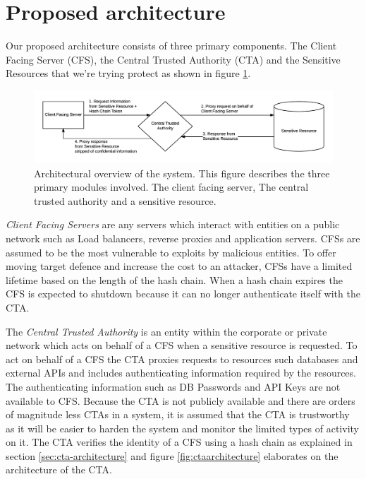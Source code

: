 \documentclass[a4paper,twoside]{article}
\begin{document}
\section{Proposed architecture}

Our proposed architecture consists of three primary components. The Client Facing Server (CFS), the Central Trusted Authority (CTA) and the Sensitive Resources that we're trying protect as shown in figure \ref{fig:architectureoverview}. 

\begin{figure}[!ht]
\includegraphics[keepaspectratio=true,scale=0.75]{overview_architecture.png}
\caption{Architectural overview of the system. This figure describes the three primary modules involved. The client facing server, The central trusted authority and a sensitive resource.}
\label{fig:architectureoverview} 
\end{figure}

\emph{Client Facing Servers} are any servers which interact with entities on a public network such as Load balancers, reverse proxies and application servers. CFSs are assumed to be the most vulnerable to exploits by malicious entities. To offer moving target defence and increase the cost to an attacker, CFSs have a limited lifetime based on the length of the hash chain. When a hash chain expires the CFS is expected to shutdown because it can no longer authenticate itself with the CTA.

The \emph{Central Trusted Authority} is an entity within the corporate or private network which acts on behalf of a CFS when a sensitive resource is requested. To act on behalf of a CFS the CTA proxies requests to resources such databases and external APIs and includes authenticating information required by the resources. The authenticating information such as DB Passwords and API Keys are not available to CFS.  Because the CTA is not publicly available and there are orders of magnitude less CTAs in a system, it is assumed that the CTA is trustworthy as it will be easier to harden the system and monitor the limited types of activity on it.
The CTA verifies the identity of a CFS using a hash chain as explained in section \ref{sec:cta-architecture} and figure \ref{fig:ctaarchitecture} elaborates on the architecture of the CTA.
\end{document}
